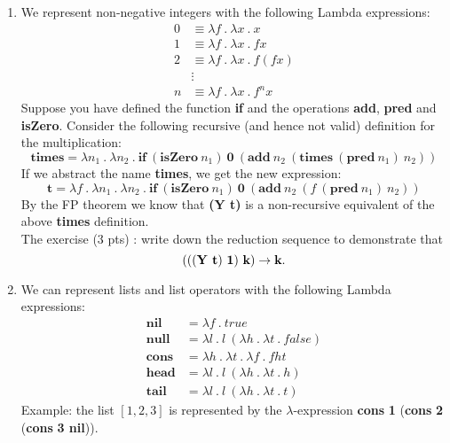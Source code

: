 \documentclass [11pt, a4wide, twoside]{article}
\begin{document}
\begin{enumerate}
\item We represent non-negative integers with the following Lambda expressions:
%
\begin{align*}
	0 & \equiv \lambda f~.~\lambda x~.~x \\
	1 & \equiv \lambda f~.~\lambda x~.~f x \\
	2 & \equiv \lambda f~.~\lambda x~.~f (f x) \\
	& \vdots  \\
	n & \equiv \lambda f~.~\lambda x~.~f^{n}x
\end{align*}
%
Suppose you have defined the function \textbf{if} and the operations \textbf{add}, \textbf{pred} and \textbf{isZero}. Consider the following recursive (and hence not valid) definition for the multiplication:
%
\begin{equation*}
\textbf{times} = \lambda n_{1}~.~\lambda n_{2}~.~\textbf{if} ~(\textbf{isZero}~ n_{1}) ~\textbf{0}~ (\textbf{add}~ n_{2}~
(\textbf{times} ~(\textbf{pred}~ n_{1}) ~n_{2}))
\end{equation*}
%
If we abstract the name \textbf{times}, we get the new expression:
%
\begin{equation*}
\textbf{t} = \lambda f~.~\lambda n_{1}~.~\lambda n_{2}~.~\textbf{if}~ (\textbf{isZero}~ n_{1}) ~\textbf{0}~ (\textbf{add}~ n_{2}~ (f~ (\textbf{pred}~ n_{1})~ n_{2}))
\end{equation*}
%
By the FP theorem we know that \textbf{(Y t)} is a non-recursive equivalent of the above \textbf{times} definition.\\

\noindent The exercise (3 pts) : write down the reduction sequence to demonstrate that
%
\begin{equation*}
(((\textbf{Y t}) ~\textbf{1}) ~\textbf{k}) \rightarrow \textbf{k}.\\
\end{equation*}
%
 
 
\solution{}


\item We can represent lists and list operators with the following Lambda expressions:
%
\begin{align*}
	\textbf{nil} & = \lambda f~.~true\\
	\textbf{null} & = \lambda l~.~l~(\lambda h~.~\lambda t~.~false)\\
	\textbf{cons} & = \lambda h~.~\lambda t~.~\lambda f~.~f h t\\
	\textbf{head} & = \lambda l~.~l~( \lambda h~.~ \lambda t~.~h)\\
	\textbf{tail} & = \lambda l~.~l~( \lambda h~.~ \lambda t~.~t)
\end{align*}
%
Example: the list $[1,2,3]$ is represented by the $\lambda$-expression \textbf{cons} \textbf{1} (\textbf{cons} \textbf{2} (\textbf{cons} \textbf{3 nil})).\pagebreak


\end{enumerate}
\end{document}
